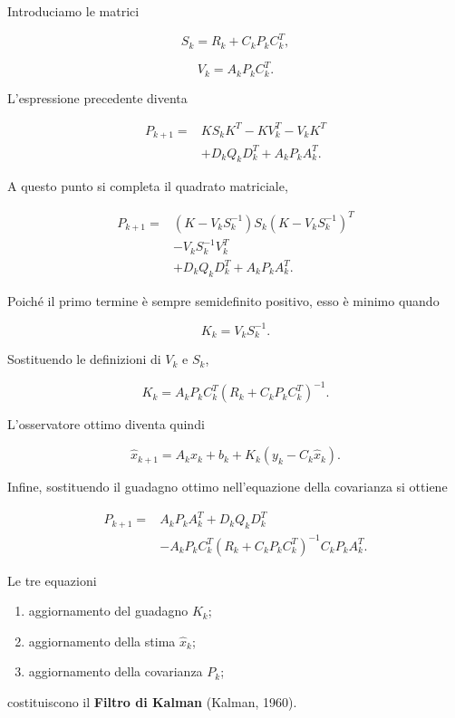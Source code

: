 \documentclass[11pt,a4paper]{article}
\begin{document}
Introduciamo le matrici

\[
\boxed{
S_k
=
R_k+C_kP_kC_k^T,
}
\]

\[
\boxed{
V_k
=
A_kP_kC_k^T.
}
\]

L'espressione precedente diventa

\[
\begin{aligned}
P_{k+1}
=
&
KS_kK^T
-
KV_k^T
-
V_kK^T
\\
&
+
D_kQ_kD_k^T
+
A_kP_kA_k^T .
\end{aligned}
\]

A questo punto si completa il quadrato matriciale,

\[
\begin{aligned}
P_{k+1}
=
&
(K-V_kS_k^{-1})
S_k
(K-V_kS_k^{-1})^T
\\
&
-
V_kS_k^{-1}V_k^T
\\
&
+
D_kQ_kD_k^T
+
A_kP_kA_k^T.
\end{aligned}
\]

Poiché il primo termine è sempre semidefinito positivo, esso è minimo quando

\[
\boxed{
K_k
=
V_kS_k^{-1}.
}
\]

Sostituendo le definizioni di $V_k$ e $S_k$,

\[
\boxed{
K_k
=
A_kP_kC_k^T
\left(
R_k+C_kP_kC_k^T
\right)^{-1}.
}
\]

L'osservatore ottimo diventa quindi

\[
\boxed{
\hat{x}_{k+1}
=
A_k\hat{x}_k
+
b_k
+
K_k
\left(
y_k-C_k\hat{x}_k
\right).
}
\]

Infine, sostituendo il guadagno ottimo nell'equazione della covarianza si ottiene

\[
\boxed{
\begin{aligned}
P_{k+1}
=
&
A_kP_kA_k^T
+
D_kQ_kD_k^T
\\
&
-
A_kP_kC_k^T
\left(
R_k+C_kP_kC_k^T
\right)^{-1}
C_kP_kA_k^T.
\end{aligned}
}
\]

Le tre equazioni

\begin{enumerate}
    \item aggiornamento del guadagno $K_k$;
    \item aggiornamento della stima $\hat{x}_k$;
    \item aggiornamento della covarianza $P_k$;
\end{enumerate}

costituiscono il \textbf{Filtro di Kalman} (Kalman, 1960).
\end{document}
